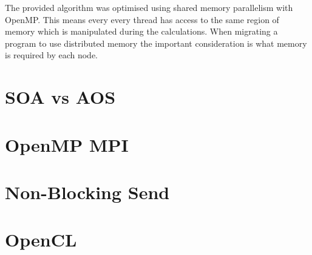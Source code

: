 \documentclass{article}
\begin{document}
\begin{multicols}{2}
\begin{tikzpicture}[every node/.style={minimum size=.5cm-\pgflinewidth, outer sep=0pt}, scale=0.5]
\end{tikzpicture}
\label{fig:cells-regions-and-halos}

The provided algorithm was optimised using shared memory parallelism with
OpenMP. This means every every thread has access to the same region of memory
which is manipulated during the calculations. When migrating a program to use
distributed memory the important consideration is what memory is required by
each node.


\section{SOA vs AOS}


\section{OpenMP MPI}


\section{Non-Blocking Send}

\section{OpenCL}

\end{multicols}
\end{document}
